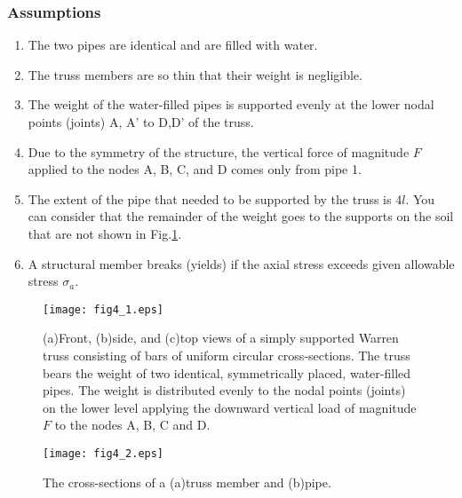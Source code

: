 \documentclass[10pt,a4j]{article}
\begin{document}
\subsubsection{Assumptions}
\begin{enumerate}
\item
	The two pipes are identical and are filled with water. 
\item
	The truss members are so thin that their weight is negligible.
\item
	The weight of the water-filled pipes is supported evenly at the lower nodal 
		points (joints) A, A' to D,D' of the truss.
\item
	Due to the symmetry of the structure, the vertical force of magnitude 
	$F$ applied to the nodes A, B, C, and D comes only from pipe 1.
\item
	The extent of the pipe that needed to be supported by the truss is $4l$. 
	You can consider that the remainder of the weight goes to the supports on the 
	soil that are not shown in Fig.\ref{fig:fig4_1}.
\item
	A structural member breaks (yields) if the axial stress exceeds given allowable stress $\sigma_a$.
\end{enumerate}
\begin{figure}
	\begin{center}
	\texttt{[image: fig4\_1.eps]} 
	\end{center}
	\caption{
		(a)Front, (b)side, and (c)top views of a simply supported Warren truss consisting 
		of bars of uniform circular cross-sections. 
		The truss bears the weight of two identical, symmetrically placed, water-filled pipes.
		The weight is distributed evenly to the nodal points (joints) on the lower level 
		applying the downward vertical load of magnitude $F$ to the nodes A, B, C and D.
	}
	\label{fig:fig4_1}
\end{figure}
\begin{figure}
	\begin{center}
	\texttt{[image: fig4\_2.eps]} 
	\end{center}
	\caption{
		The cross-sections of a (a)truss member and (b)pipe.  
	}
	\label{fig:fig4_2}
\end{figure}
\end{document}

